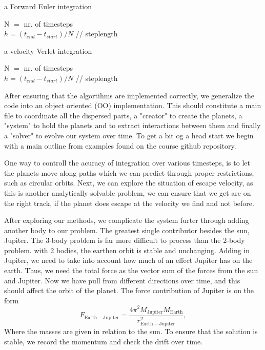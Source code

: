 \documentclass[10pt, twocolumn]{revtex4-1}
\begin{document}
\begin{algorithm}
    \caption{a Forward Euler integration}
    N $=$ nr. of timesteps \\
    $h = (t_{end} - t_{start})/N $ // steplength \\
\end{algorithm}

\begin{algorithm}
    \caption{a velocity Verlet integration}
    N $=$ nr. of timesteps \\
    $h = (t_{end} - t_{start})/N $ // steplength \\
\end{algorithm}

After ensuring that the algortihms are implemented correctly, we generalize the code into an object oriented (OO)
implementation. This should constitute a main file to coordinate all the dispersed parts, a "creator" to create the planets, 
a "system" to hold the planets and to extract interactions between them and finally a "solver" to evolve our system over time. 
To get a bit og a head start we begin with a main outline from examples found on the course github repository\cite{coursegithub}. 

One way to controll the acuracy of integration over various timesteps, is to let the planets move along paths which we can predict through
proper restrictions, such as circular orbits. Next, we can explore the situation of escape velocity, as this is another analytically solvable problem,
we can ensure that we get are on the right track, if the planet does escape at the velocity we find and not before. 

After exploring our methods, we complicate the system furter through adding another body to our problem. The greatest single contributor
besides the sun, Jupiter. The 3-body problem is far more difficult to process than the 2-body problem. with 2 bodies, the earthen orbit is stable and
unchanging. Adding in Jupiter, we need to take into account how much of an effect Jupiter has on the earth. Thus, we need the total force as the 
vector sum of the forces from the sun and Jupiter. Now we have pull from different directions over time, and this should affect the orbit of the planet.
The force contribution of Jupiter is on the form
\[
F_{\mathrm{Earth-Jupiter}}=\frac{4\pi^2 M_{\mathrm{Jupiter}}M_{\mathrm{Earth}}}{r_{\mathrm{Earth-Jupiter}}^2},
\]
Where the masses are given in relation to the sun. To ensure that the solution is stable, we record the momentum and check the drift over time. 
\end{document}
